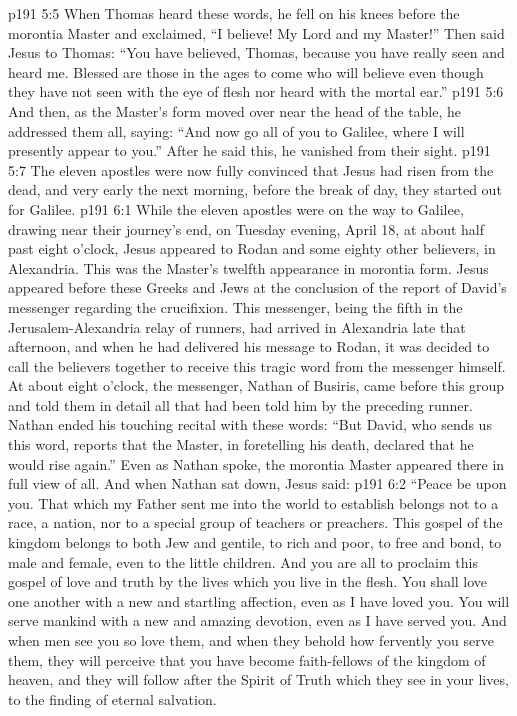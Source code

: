 \vs p191 5:5 When Thomas heard these words, he fell on his knees before the morontia Master and exclaimed, “I believe! My Lord and my Master!” Then said Jesus to Thomas: \textcolor{ubdarkred}{“You have believed, Thomas, because you have really seen and heard me. Blessed are those in the ages to come who will believe even though they have not seen with the eye of flesh nor heard with the mortal ear.”}
\vs p191 5:6 And then, as the Master’s form moved over near the head of the table, he addressed them all, saying: \textcolor{ubdarkred}{“And now go all of you to Galilee, where I will presently appear to you.”} After he said this, he vanished from their sight.
\pc \vs p191 5:7 The eleven apostles were now fully convinced that Jesus had risen from the dead, and very early the next morning, before the break of day, they started out for Galilee.
\vs p191 6:1 While the eleven apostles were on the way to Galilee, drawing near their journey’s end, on Tuesday evening, April 18, at about half past eight o’clock, Jesus appeared to Rodan and some eighty other believers, in Alexandria. This was the Master’s twelfth appearance in morontia form. Jesus appeared before these Greeks and Jews at the conclusion of the report of David’s messenger regarding the crucifixion. This messenger, being the fifth in the Jerusalem\hyp{}Alexandria relay of runners, had arrived in Alexandria late that afternoon, and when he had delivered his message to Rodan, it was decided to call the believers together to receive this tragic word from the messenger himself. At about eight o’clock, the messenger, Nathan of Busiris, came before this group and told them in detail all that had been told him by the preceding runner. Nathan ended his touching recital with these words: “But David, who sends us this word, reports that the Master, in foretelling his death, declared that he would rise again.” Even as Nathan spoke, the morontia Master appeared there in full view of all. And when Nathan sat down, Jesus said:
\vs p191 6:2 \textcolor{ubdarkred}{“Peace be upon you. That which my Father sent me into the world to establish belongs not to a race, a nation, nor to a special group of teachers or preachers. This gospel of the kingdom belongs to both Jew and gentile, to rich and poor, to free and bond, to male and female, even to the little children. And you are all to proclaim this gospel of love and truth by the lives which you live in the flesh. You shall love one another with a new and startling affection, even as I have loved you. You will serve mankind with a new and amazing devotion, even as I have served you. And when men see you so love them, and when they behold how fervently you serve them, they will perceive that you have become faith\hyp{}fellows of the kingdom of heaven, and they will follow after the Spirit of Truth which they see in your lives, to the finding of eternal salvation.}
